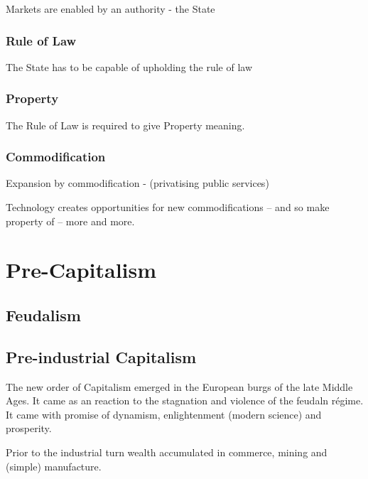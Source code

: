 \documentclass[
]{book}
\begin{document}
Markets are enabled by an authority - the State

\hypertarget{rule-of-law}{%
\subsection{Rule of Law}\label{rule-of-law}}

The State has to be capable of upholding the rule of law

\hypertarget{property}{%
\subsection{Property}\label{property}}

The Rule of Law is required to give Property meaning.

\hypertarget{commodification}{%
\subsection{Commodification}\label{commodification}}

Expansion by commodification - (privatising public services)

Technology creates opportunities for new commodifications -- and so make property of --
more and more.

\hypertarget{pre-capitalism}{%
\chapter{Pre-Capitalism}\label{pre-capitalism}}

\hypertarget{feudalism}{%
\section{Feudalism}\label{feudalism}}

\hypertarget{pre-industrial-capitalism}{%
\section{Pre-industrial Capitalism}\label{pre-industrial-capitalism}}

The new order of Capitalism emerged in the European burgs of the late Middle Ages.
It came as an reaction to the stagnation and violence of the feudaln régime.
It came with promise of dynamism, enlightenment (modern science) and prosperity.

Prior to the industrial turn wealth accumulated in commerce, mining and (simple)
manufacture.
\end{document}

